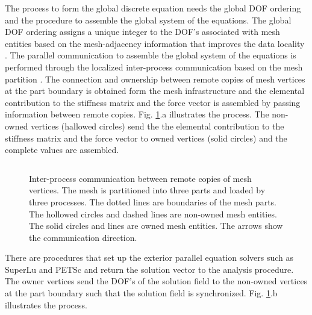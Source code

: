 \documentclass[11pt]{article}  %
\begin{document}
The process to form the global discrete equation needs the global DOF ordering and the procedure to assemble the global system of the equations. The global DOF ordering assigns a unique integer to the DOF's associated with mesh entities based on the mesh-adjacency information that improves the data locality \cite{zhou2010adjacency}. The parallel communication to assemble the global system of the equations is performed through the localized inter-process communication based on the mesh partition \cite{sahni2009strong,ovcharenko2012neighborhood}.  The connection and ownership between remote copies of mesh vertices \cite{Seol2014} at the part boundary is obtained form the mesh infrastructure and the elemental contribution to the stiffness matrix and the force vector is assembled by passing information between remote copies. Fig. \ref{fig:msgpassformat}.a illustrates the process. The non-owned vertices (hallowed circles) send the  the elemental contribution to the stiffness matrix and the force vector to owned vertices (solid circles) and the complete values are assembled.

\begin{figure}[htb]
\center
\begin{tabular}{cc}
\end{tabular}
\caption{Inter-process communication between remote copies of mesh vertices. The mesh is partitioned into three parts and loaded by three processes. The dotted lines are boundaries of the mesh parts. The hollowed circles and dashed lines are non-owned mesh entities. The solid circles and lines are owned mesh entities. The arrows show the communication direction.} \label{fig:msgpassformat}
\end{figure}


There are procedures that set up the exterior  parallel equation solvers such as SuperLu \cite{superlu_ug99} and PETSc \cite{petsc-web-page} and return the solution vector to the analysis procedure. The owner vertices send the DOF's of the solution field to the non-owned vertices at the part boundary such that the solution field is synchronized. Fig. \ref{fig:msgpassformat}.b illustrates the process.
\end{document}
